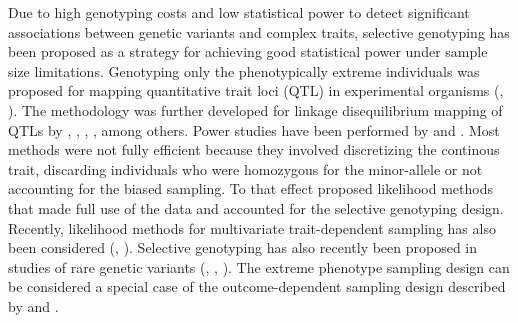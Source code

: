 \documentclass[10pt,a4paper]{article}
\begin{document}
Due to high genotyping costs and low statistical power to detect significant associations between genetic variants and complex traits, selective genotyping has been proposed as a strategy for achieving good statistical power under sample size limitations. Genotyping only the phenotypically extreme individuals was proposed for mapping quantitative trait loci (QTL) in experimental organisms (\cite{lebowitz1987trait}, \cite{lander1989mapping}). The methodology was further developed for linkage disequilibrium mapping of QTLs by \cite{darvasi1992selective}, \cite{slatkin1999disequilibrium}, \cite{chen2005linkage}, \cite{wallace2006improved}, among others. Power studies have been performed by \cite{van2000power} and \cite{xing2009power}. Most methods were not fully efficient because they involved discretizing the continous trait, discarding individuals who were homozygous for the minor-allele or not accounting for the biased sampling. To that effect \cite{huang2007eps} proposed likelihood methods that made full use of the data and accounted for the selective genotyping design. Recently, likelihood methods for multivariate trait-dependent sampling has also been considered (\cite{lin2013quantitative}, \cite{tao2015epsmultivar}). Selective genotyping has also recently been proposed in studies of rare genetic variants (\cite{li2011using}, \cite{guey2011power}, \cite{barnett2013detecting}). The extreme phenotype sampling design can be considered a special case of the outcome-dependent sampling design described by \cite{zhou2002semiparametric} and \cite{weaver2005ods}. 
\end{document}
